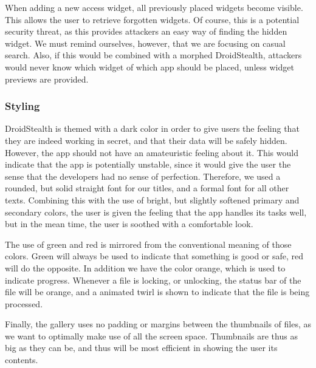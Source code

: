 When adding a new access widget, all previously placed widgets become visible. This allows 
the user to retrieve forgotten widgets. Of course, this is a potential security threat, as this 
provides attackers an easy way of finding the hidden widget. We must remind ourselves, 
however, that we are focusing on casual search. Also, if this would be combined with
a morphed DroidStealth, attackers would never know which widget of which app should be
placed, unless widget previews are provided.

\subsubsection{Styling}

DroidStealth is themed with a dark color in order to give users the feeling that they are indeed
working in secret, and that their data will be safely hidden. However, the app should not
have an amateuristic feeling about it. This would indicate that the app is potentially unstable, 
since it would give the user the sense that the developers had no sense of perfection. 
Therefore, we used a rounded, but solid straight font for our titles, and a formal font for 
all other texts. Combining this with the use of bright, but slightly softened primary and 
secondary colors, the user is given the feeling that the app handles its tasks well, but in 
the mean time, the user is soothed with a comfortable look. %

The use of green and red is mirrored from the conventional meaning of those colors. Green 
will always be used to indicate that something is good or safe, red will do the opposite. 
In addition we have the color orange, which is used to indicate progress. Whenever a file is 
locking, or unlocking, the status bar of the file will be orange, and a animated twirl is shown 
to indicate that the file is being processed. %

Finally, the gallery uses no padding or margins between the thumbnails of files, as we want 
to optimally make use of all the screen space. Thumbnails are thus as big as they can be, 
and thus will be most efficient in showing the user its contents. 
